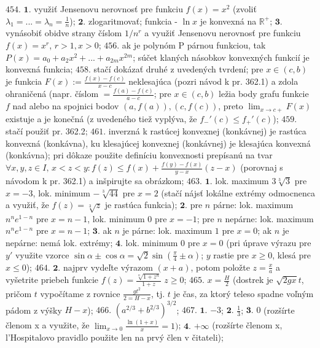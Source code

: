 $\boxed{454.}$ $\boldsymbol{1.}$ využiť Jensenovu nerovnosť pre funkciu $f(x)=x^{2}$ (zvoliť  $\lambda _{1}=...=\lambda _{n}=\frac{1}{n}$);
$\boldsymbol{2.}$ zlogaritmovať; funkcia - $\ln x$ je konvexná na $\mathbb{R}^{+}$;
$\boldsymbol{3.}$ vynásobiť obidve strany číslom $1/n^{r}$ a využiť Jensenovu nerovnosť pre funkciu $f(x)=x^{r}$, $r>1, x>0$;
$\boxed{456.}$ ak je polynóm P párnou funkciou, tak $P(x)=a_{0}+a_{2}x^{2}+...+a_{2m}x^{2m}$; súčet klaných násobkov konvexných funkcií je konvexná funkcia;
$\boxed{458.}$ stačí dokázať druhé z uvedených tvrdení; pre $x\in (c,b)$ je funkcia $F(x):=\frac{f(x)-f(c)}{x-c}$ neklesajúca (pozri návod k pr. 362.1) a zdola ohraničená (napr. číslom $=\frac{f(a)-f(c)}{a-c}$; pre $x\in (c,b)$ ležia body grafu funkcie $f$  nad alebo na spojnici bodov $(a,f(a)), (c,f(c))$, preto $\lim_{x \to c+}F(x)$  existuje a je konečná (z uvedeného tiež vyplýva, že $f_{-}'(c)\leq f_{+}'(c)$);
$\boxed{459.}$ stačí použiť pr. 362.2;
$\boxed{461.}$ inverzná k rastúcej konvexnej (konkávnej) je rastúca konvexná (konkávna), ku klesajúcej  konvexnej (konkávnej) je klesajúca konvexná (konkávna); pri  dôkaze použite definíciu konvexnosti prepísanú na tvar $\forall x,y,z\in I,\, x<z<y: f(z)\leq f(x) +\frac{f(y)-f(x)}{y-x}(z-x)$ (porovnaj s návodom k pr. 362.1) a inšpirujte sa obrázkom;
$\boxed{463.}$ $\boldsymbol{1.}$ lok. maximum $3\sqrt[3]{3}$ pre $x=-3$, lok. minimum $-\sqrt[3]{44}$ pre $x=2$ (stačí nájsť lokálne extrémy odmocnenca a využiť, že $f(z)=\sqrt[3]{z}$ je rastúca funkcia);
$\boldsymbol{2.}$  pre $n$ párne: lok. maximum $n^{n}e^{1-n}$ pre $x=n-1$, lok. minimum 0 pre  $x=-1$; pre $n$ nepárne: lok. maximum $n^{n}e^{1-n}$ pre $x=n-1$;
$\boldsymbol{3.}$ ak $n$ je  párne: lok. maximum  $1$ pre $x=0$; ak $n$ je  nepárne: nemá lok. extrémy;
$\boldsymbol{4.}$ lok. minimum 0 pre  $x=0$ (pri úprave výrazu pre $y'$ využite vzorce $\sin \alpha \pm \cos \alpha = \sqrt{2}\sin (\frac{\pi}{4}\pm \alpha )$; $y$ rastie pre $x\geq 0$, klesá pre $x\leq 0$);
$\boxed{464.}$ $\boldsymbol{2.}$  najprv vydeľte výrazom $(x+a)$, potom položte $z=\frac{x}{a}$  a vyšetrite priebeh funkcie $f(z)=\frac{\sqrt[n]{1+z^{n}}}{1+z}$ $z\geq 0$;
$\boxed{465.}$  $x=\frac{H}{2}$ (dostrek je $\sqrt{2gx}t$, pričom $t$ vypočítame z rovnice $\frac{gt^{2}}{2=H-x}$, tj. $t$ je čas, za ktorý teleso spadne voľným pádom z výšky $H-x$);
$\boxed{466.}$  $(a^{2/3}+b^{2/3})^{3/2}$;
$\boxed{467.}$  $\boldsymbol{1.}$ $-3$;
$\boldsymbol{2.}$ $\frac{1}{3}$;
$\boldsymbol{3.}$ $0$ (rozšírte členom x a využite, že $\lim_{x \to 0}\frac{\ln (1+x)}{x}=1)$;
$\boldsymbol{4.}$ $+\infty$ (rozšírte členom x, l'Hospitalovo pravidlo použite len na prvý člen v čitateli);
